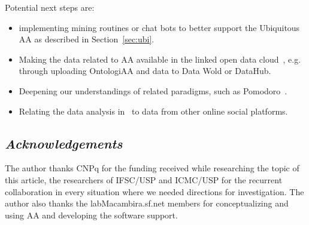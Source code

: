 \documentclass[12pt,fleqn]{article}
\begin{document}
Potential next steps are:
\begin{itemize}
	\item implementing mining routines or chat bots to better support the Ubiquitous AA
		as described in Section~\ref{sec:ubi}.
	\item Making the data related to AA available in the linked open data cloud~\citep{LOD,losd},
		e.g. through uploading OntologiAA and data to Data Wold or DataHub.
	\item Deepening our understandings of related paradigms, such as Pomodoro~\citep{pomodoro}.
	\item Relating the data analysis in~\cite{ensaaio} to data from other online social platforms.
\end{itemize}

\subsection*{\textit{Acknowledgements}}
The author thanks CNPq for the funding received while researching the topic of this article,
the researchers of IFSC/USP and ICMC/USP for the recurrent collaboration in every situation
where we needed directions for investigation.
The author also thanks the labMacambira.sf.net members for conceptualizing and using AA
and developing the software support.
\end{document}
